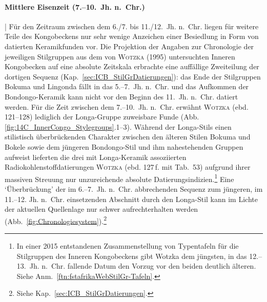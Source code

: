 \paragraph{Mittlere Eisenzeit (7.--10.~Jh. n.~Chr.)}\hspace{-.5em}|\hspace{.5em}\label{sec:MIA}%
Für den Zeitraum zwischen dem 6./7. bis 11./12.~Jh. n.~Chr. liegen für weitere Teile des Kongobeckens nur sehr wenige Anzeichen einer Besiedlung in Form von datierten Keramikfunden vor. Die Projektion der Angaben zur Chronologie der jeweiligen Stilgruppen aus dem von \textsc{Wotzka} (1995) untersuchten Inneren Kongobecken auf eine absolute Zeitskala erbrachte eine auffällige Zweiteilung der dortigen Sequenz (Kap.~\ref{sec:ICB_StilGrDatierungen}): das Ende der Stilgruppen Bokuma und Lingonda fällt in das 5.--7.~Jh. n.~Chr. und das Aufkommen der Bondongo-Keramik kann nicht vor den Beginn des 11.~Jh. n.~Chr. datiert werden. Für die Zeit zwischen dem 7.--10.~Jh. n.~Chr. erwähnt \textsc{Wotzka} (ebd. 121--128) lediglich der Longa-Gruppe zuweisbare Funde (Abb. \ref{fig:14C_InnerCongo_Stylegroups}.1--3). Während der Longa-Stils einen stilistisch überbrückenden Charakter zwischen den älteren Stilen Bokuma und Bokele sowie dem jüngeren Bondongo-Stil und ihm nahestehenden Gruppen aufweist lieferten die drei mit Longa-Keramik assoziierten Radiokohlenstoffdatierungen \textsc{Wotzka} (ebd. 127\,f. mit Tab.~53) aufgrund ihrer massiven Streuung nur unzureichende absolute Datierungsindizien.\footnote{In einer 2015 entstandenen Zusammenstellung von Typentafeln für die Stilgruppen des Inneren Kongobeckens gibt Wotzka dem jüngsten, in das 12.--13.~Jh. n.~Chr. fallende Datum den Vorzug vor den beiden deutlich älteren. Siehe Anm.~\ref{ftn:fstafrikaWebStilGr-Tafeln}.} Eine \enquote*{Überbrückung} der im 6.--7.~Jh. n.~Chr. abbrechenden Sequenz zum jüngeren, im 11.--12. Jh. n.~Chr. einsetzenden Abschnitt durch den Longa-Stil kann im Lichte der aktuellen Quellenlage nur schwer aufrechterhalten werden (Abb.~\ref{fig:Chronologiesystem}).\footnote{Siehe Kap.~\ref{sec:ICB_StilGrDatierungen}.} 

